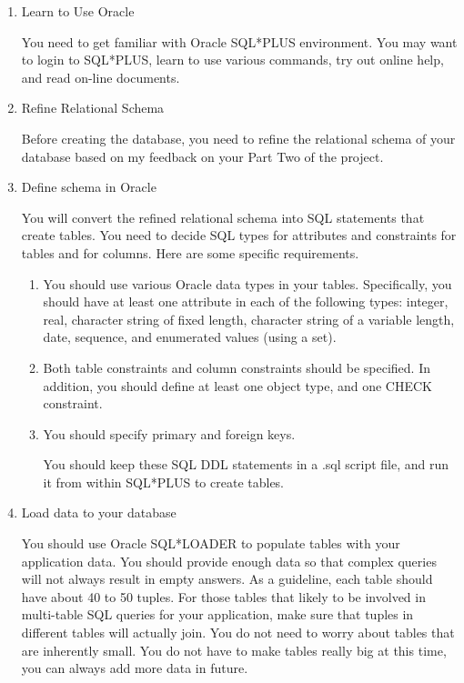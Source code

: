 \documentclass[11pt]{article}
\begin{document}
\begin{enumerate}
\item Learn to Use Oracle

     You need to get familiar with Oracle SQL*PLUS environment. You
     may want to login to SQL*PLUS, learn to use various commands, try
     out online help, and read on-line documents.
\item Refine Relational Schema
     
     Before creating the database, you need to refine the relational
     schema of your database based on my feedback on your Part Two of
     the project.
\item Define schema in Oracle 

     You will convert the refined relational schema into SQL
     statements that create tables. You need to decide SQL types for
     attributes and constraints for tables and for columns. Here are
     some specific requirements.
\begin{enumerate}
\item You should use various Oracle data types in your
       tables. Specifically, you should have at least one attribute in
       each of the following types: integer, real, character string of
       fixed length, character string of a variable length, date,
       sequence, and enumerated values (using a set).
\item Both table constraints and column constraints should be
       specified. In addition, you should define at least one object
       type, and one CHECK constraint.
\item You should specify primary and foreign keys.

       You should keep these SQL DDL statements in a .sql script file,
       and run it from within SQL*PLUS to create tables.
\end{enumerate}
\item Load data to your database

     You should use Oracle SQL*LOADER to populate tables with your
     application data. You should provide enough data so that complex
     queries will not always result in empty answers. As a guideline,
     each table should have about 40 to 50 tuples. For those tables
     that likely to be involved in multi-table SQL queries for your
     application, make sure that tuples in different tables will
     actually join. You do not need to worry about tables that are
     inherently small. You do not have to make tables really big at
     this time, you can always add more data in future.
\end{enumerate}
\end{document}
